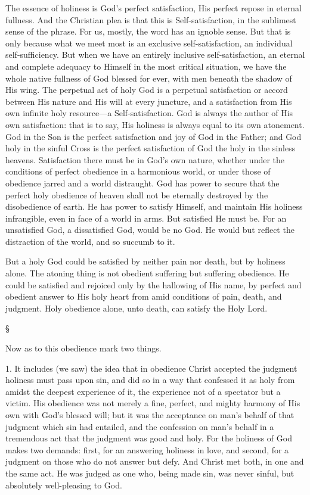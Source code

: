 \documentclass[12pt,a5paper,twoside,titlepage]{book}
\begin{document}
The essence of holiness is God's perfect 
satisfaction, His perfect repose in eternal fullness. 
And the Christian plea is that this is 
Self-satisfaction, in the sublimest sense of the 
phrase. For us, mostly, the word has an ignoble 
sense. But that is only because what we meet 
most is an exclusive self-satisfaction, an individual 
self-sufficiency. But when we have 
an entirely inclusive self-satisfaction, an eternal 
and complete adequacy to Himself in the most 
critical situation, we have the whole native fullness 
of God blessed for ever, with men beneath 
the shadow of His wing. The perpetual act of 
holy God is a perpetual satisfaction or accord 
between His nature and His will at every juncture, 
and a satisfaction from His own infinite 
holy resource---a Self-satisfaction. God is always 
the author of His own satisfaction: that is to say, 
His holiness is always equal to its own atonement. 
God in the Son is the perfect satisfaction 
and joy of God in the Father; and God holy 
in the sinful Cross is the perfect satisfaction of 
God the holy in the sinless heavens. Satisfaction 
there must be in God's own nature, whether 
under the conditions of perfect obedience in a 
harmonious world, or under those of obedience 
jarred and a world distraught. God has power 
to secure that the perfect holy obedience of 
heaven shall not be eternally destroyed by the 
disobedience of earth. He has power to satisfy 
Himself, and maintain His holiness infrangible, 
even in face of a world in arms. But satisfied He 
must be. For an unsatisfied God, a dissatisfied 
God, would be no God. He would but reflect the 
distraction of the world, and so succumb to it. 

But a holy God could be satisfied by neither 
pain nor death, but by holiness alone. The 
atoning thing is not obedient suffering but 
suffering obedience. He could be satisfied and 
rejoiced only by the hallowing of His name, 
by perfect and obedient answer to His holy 
heart from amid conditions of pain, death, and 
judgment. Holy obedience alone, unto death, 
can satisfy the Holy Lord. 

\begin{center}
\S
\end{center}

Now as to this obedience mark two things. 

1. It includes (we saw) the idea that in obedience 
Christ accepted the judgment holiness 
must pass upon sin, and did so in a way that 
confessed it as holy from amidst the deepest 
experience of it, the experience not of a spectator 
but a victim. His obedience was not 
merely a fine, perfect, and mighty harmony 
of His own with God's blessed will; but it 
was the acceptance on man's behalf of that 
judgment which sin had entailed, and the confession 
on man's behalf in a tremendous act 
that the judgment was good and holy. For the 
holiness of God makes two demands: first, for 
an answering holiness in love, and second, for a 
judgment on those who do not answer but defy. 
And Christ met both, in one and the same act. 
He was judged as one who, being made sin, was 
never sinful, but absolutely well-pleasing to God. 
\end{document}
